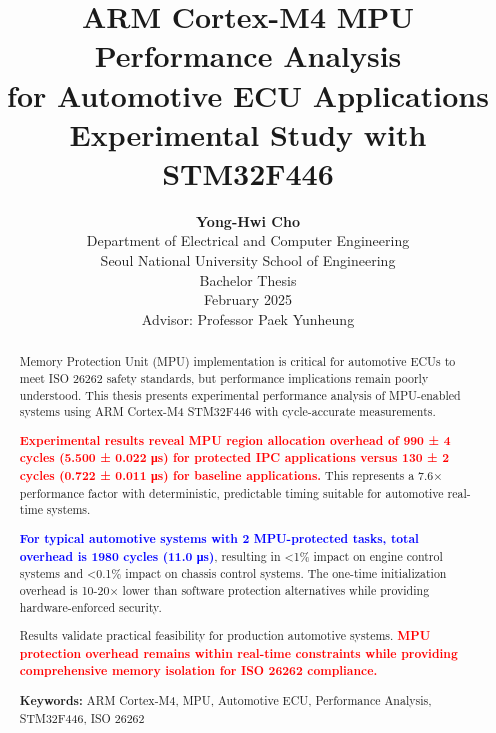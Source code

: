 \documentclass[12pt,a4paper,oneside]{report}
\title{
    \textbf{\LARGE ARM Cortex-M4 MPU Performance Analysis\\
    for Automotive ECU Applications}\\
    \vspace{0.3cm}
    \large{Experimental Study with STM32F446}
}
\author{
    \textbf{Yong-Hwi Cho}\\
    \vspace{0.5cm}
    Department of Electrical and Computer Engineering\\
    Seoul National University School of Engineering\\
    \vspace{0.5cm}
    Bachelor Thesis\\
    February 2025\\
    \vspace{0.5cm}
    \small{Advisor: Professor Paek Yunheung}
}
\date{}
\newcommand{\keyresult}[1]{\textbf{\textcolor{red}{#1}}}
\newcommand{\measurement}[1]{\textbf{\textcolor{blue}{#1}}}
\begin{document}
\maketitle
\thispagestyle{empty}

\newpage
\begin{abstract}
\vspace{1cm}

Memory Protection Unit (MPU) implementation is critical for automotive ECUs to meet ISO 26262 safety standards, but performance implications remain poorly understood. This thesis presents experimental performance analysis of MPU-enabled systems using ARM Cortex-M4 STM32F446 with cycle-accurate measurements.

\keyresult{Experimental results reveal MPU region allocation overhead of 990 ± 4 cycles (5.500 ± 0.022 μs) for protected IPC applications versus 130 ± 2 cycles (0.722 ± 0.011 μs) for baseline applications.} This represents a 7.6× performance factor with deterministic, predictable timing suitable for automotive real-time systems.

\measurement{For typical automotive systems with 2 MPU-protected tasks, total overhead is 1980 cycles (11.0 μs)}, resulting in <1\% impact on engine control systems and <0.1\% impact on chassis control systems. The one-time initialization overhead is 10-20× lower than software protection alternatives while providing hardware-enforced security.

Results validate practical feasibility for production automotive systems. \keyresult{MPU protection overhead remains within real-time constraints while providing comprehensive memory isolation for ISO 26262 compliance.}

\vspace{0.5cm}
\textbf{Keywords:} ARM Cortex-M4, MPU, Automotive ECU, Performance Analysis, STM32F446, ISO 26262

\end{abstract}

\newpage
\tableofcontents
\newpage
\listoffigures
\newpage
\listoftables

\newpage
\setcounter{page}{1}

\pagestyle{fancy}
\fancyhead[L]{\leftmark}
\fancyhead[R]{\thepage}
\fancyhead[C]{}
\fancyfoot{}








\end{document}
